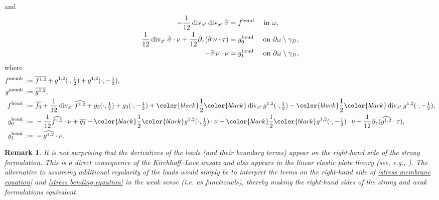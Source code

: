 \documentclass[reqno,10pt]{amsart}
\numberwithin{equation}{section}
\newtheorem{remark}[theorem]{Remark}
\theoremstyle{remark}
\newcommand{\RED}{\color{black}}
\newcommand{\BLACK}{\color{black}}
\newcommand{\PINK}{\color{black}}
\renewcommand{\div}{\operatorname{div}}
\newcommand{\fvol}{f}
\newcommand{\fsurf}{g}
\newcommand{\Dir}{D}
\newcommand{\zerothI}[1]{\overline{#1}}
\newcommand{\firstI}[1]{\widehat{#1}}
\begin{document}
and
\begin{equation}\label{stress bending equation} 
\begin{split}
	-\frac{1}{12} \div_{x'}\div_{x'}\firstI{\sigma} & = f^{\rm bend} \quad \text{ in } \omega, 
	\\ \frac{1}{12} \div_{x'}\firstI{\sigma}\cdot\nu + \frac{1}{12} \partial_{\tau}(\firstI{\sigma}\,\nu\cdot\tau) & = g^{\rm bend}_0 \quad \text{ on } \partial{\omega} \setminus \gamma_\Dir,
	\\ - \firstI{\sigma}\,\nu\cdot\nu & = g^{\rm bend}_1 \quad \text{ on } \partial{\omega} \setminus \gamma_\Dir,
\end{split}
\end{equation}
where
\begin{equation} \label{limit loads expresions}
\begin{split}
	f^{\rm memb} \,:=\ & \zerothI{\fvol^{1,2}} 
	+ \fsurf^{1,2}(\cdot,\tfrac{1}{2}) + \fsurf^{1,2}(\cdot,-\tfrac{1}{2}), 
	\\ g^{\rm memb} \,:=\ & \zerothI{\fsurf^{1,2}}, 
	\\ f^{\rm bend} \,:=\ & \zerothI{\fvol_{3}} + \frac{1}{12} \div_{x'}\firstI{\fvol^{1,2}} 
	+ \fsurf_{3}(\cdot,\tfrac{1}{2}) + \fsurf_{3}(\cdot,-\tfrac{1}{2}) + {\RED\frac{1}{2}\BLACK} \div_{x'}\fsurf^{1,2}(\cdot,\tfrac{1}{2}) - {\RED\frac{1}{2}\BLACK} \div_{x'}\fsurf^{1,2}(\cdot,-\tfrac{1}{2}), 
	\\ g^{\rm bend}_0 \,:=\ & - \frac{1}{12} \firstI{\fvol^{1,2}}\cdot\nu + \zerothI{\fsurf_{3}} - {\RED\frac{1}{2}\BLACK} \fsurf^{1,2}(\cdot,\tfrac{1}{2})\cdot\nu + {\RED\frac{1}{2}\BLACK} \fsurf^{1,2}(\cdot,-\tfrac{1}{2})\cdot\nu + \frac{1}{12} \partial_{\tau}(\firstI{\fsurf^{1,2}}\cdot\tau),
	\\ g^{\rm bend}_1 \,:=\ & - \firstI{\fsurf^{1,2}}\cdot\nu.
\end{split}
\end{equation}
\begin{remark} 
{\PINK It is not surprising that the derivatives of the loads (and their boundary terms) appear on the right-hand side of the strong formulation.
This is a direct consequence of the Kirchhoff--Love ansatz and also appears in the linear elastic plate theory (see, e.g., \cite{ciarlet1997mathematical}).
The alternative to assuming additional regularity of the loads would simply be to interpret the terms on the right-hand side of \eqref{stress membrane equation} and  \eqref{stress bending equation} in the weak sense (i.e. as functionals), thereby making the right-hand sides of the strong and weak formulations equivalent. \BLACK}
\end{remark} 
\end{document}
